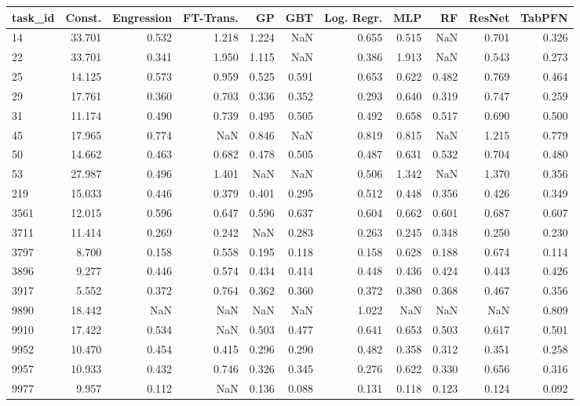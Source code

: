 \begin{tabular}{lrrrrrrrrrr}
\toprule
task\_id & Const. & Engression & FT-Trans. & GP & GBT & Log. Regr. & MLP & RF & ResNet & TabPFN \\
\midrule
14 & 33.701 & 0.532 & 1.218 & 1.224 & NaN & 0.655 & 0.515 & NaN & 0.701 & 0.326 \\
22 & 33.701 & 0.341 & 1.950 & 1.115 & NaN & 0.386 & 1.913 & NaN & 0.543 & 0.273 \\
25 & 14.125 & 0.573 & 0.959 & 0.525 & 0.591 & 0.653 & 0.622 & 0.482 & 0.769 & 0.464 \\
29 & 17.761 & 0.360 & 0.703 & 0.336 & 0.352 & 0.293 & 0.640 & 0.319 & 0.747 & 0.259 \\
31 & 11.174 & 0.490 & 0.739 & 0.495 & 0.505 & 0.492 & 0.658 & 0.517 & 0.690 & 0.500 \\
45 & 17.965 & 0.774 & NaN & 0.846 & NaN & 0.819 & 0.815 & NaN & 1.215 & 0.779 \\
50 & 14.662 & 0.463 & 0.682 & 0.478 & 0.505 & 0.487 & 0.631 & 0.532 & 0.704 & 0.480 \\
53 & 27.987 & 0.496 & 1.401 & NaN & NaN & 0.506 & 1.342 & NaN & 1.370 & 0.356 \\
219 & 15.033 & 0.446 & 0.379 & 0.401 & 0.295 & 0.512 & 0.448 & 0.356 & 0.426 & 0.349 \\
3561 & 12.015 & 0.596 & 0.647 & 0.596 & 0.637 & 0.604 & 0.662 & 0.601 & 0.687 & 0.607 \\
3711 & 11.414 & 0.269 & 0.242 & NaN & 0.283 & 0.263 & 0.245 & 0.348 & 0.250 & 0.230 \\
3797 & 8.700 & 0.158 & 0.558 & 0.195 & 0.118 & 0.158 & 0.628 & 0.188 & 0.674 & 0.114 \\
3896 & 9.277 & 0.446 & 0.574 & 0.434 & 0.414 & 0.448 & 0.436 & 0.424 & 0.443 & 0.426 \\
3917 & 5.552 & 0.372 & 0.764 & 0.362 & 0.360 & 0.372 & 0.380 & 0.368 & 0.467 & 0.356 \\
9890 & 18.442 & NaN & NaN & NaN & NaN & 1.022 & NaN & NaN & NaN & 0.809 \\
9910 & 17.422 & 0.534 & NaN & 0.503 & 0.477 & 0.641 & 0.653 & 0.503 & 0.617 & 0.501 \\
9952 & 10.470 & 0.454 & 0.415 & 0.296 & 0.290 & 0.482 & 0.358 & 0.312 & 0.351 & 0.258 \\
9957 & 10.933 & 0.432 & 0.746 & 0.326 & 0.345 & 0.276 & 0.622 & 0.330 & 0.656 & 0.316 \\
9977 & 9.957 & 0.112 & NaN & 0.136 & 0.088 & 0.131 & 0.118 & 0.123 & 0.124 & 0.092 \\

\end{tabular}
